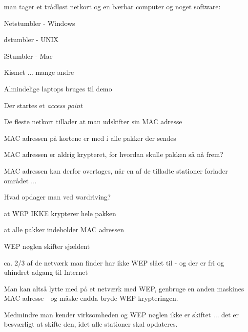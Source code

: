 

\begin{list1}
\item man tager et trådløst netkort og en bærbar computer og noget software:
\begin{list2}
\item Netstumbler - Windows 
\item dstumbler - UNIX 
\item iStumbler - Mac 
\item Kismet ... mange andre
  \end{list2}
\end{list1}



\begin{list2}
\item Almindelige laptops bruges til demo
\item Der startes et \emph{access point}
\end{list2}


\begin{list1}
\item De fleste netkort tillader at man udskifter sin MAC adresse
\item MAC adressen på kortene er med i alle pakker der sendes
\item MAC adressen er aldrig krypteret, for hvordan skulle pakken så
  nå frem?
\item MAC adressen kan derfor overtages, når en af de tilladte
  stationer forlader området ...
\end{list1}


\begin{list1}
\item Hvad opdager man ved wardriving?
\begin{list2}
\item at WEP IKKE krypterer hele pakken
\item at alle pakker indeholder MAC adressen
\item WEP nøglen skifter sjældent
\item ca. 2/3 af de netværk man finder har ikke WEP slået til - og der
  er fri og uhindret adgang til Internet
\end{list2}
\item {\color{red}
Man kan altså lytte med på et netværk med WEP, genbruge en anden
maskines MAC adresse - og måske endda bryde WEP krypteringen.}
\item 
Medmindre man kender virksomheden og WEP nøglen ikke er skiftet ...
det er besværligt at skifte den, idet alle stationer skal opdateres.
\end{list1}

